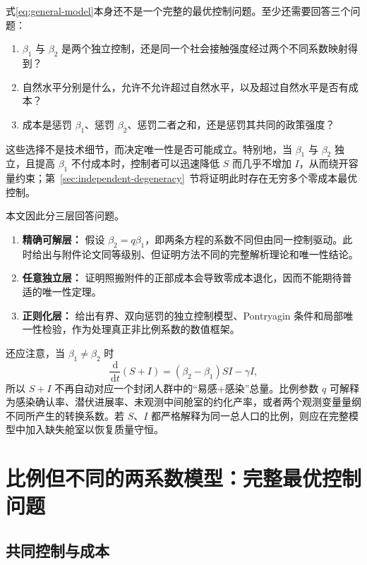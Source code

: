 \documentclass[11pt,a4paper,UTF8]{ctexart}
\theoremstyle{definition}
\newcommand{\dd}{\,\mathrm{d}}
\begin{document}
式\eqref{eq:general-model}本身还不是一个完整的最优控制问题。至少还需要回答三个问题：
\begin{enumerate}[label=(\roman*),leftmargin=3em]
\item $\beta_1$ 与 $\beta_2$ 是两个独立控制，还是同一个社会接触强度经过两个不同系数映射得到？
\item 自然水平分别是什么，允许不允许超过自然水平，以及超过自然水平是否有成本？
\item 成本是惩罚 $\beta_1$、惩罚 $\beta_2$、惩罚二者之和，还是惩罚其共同的政策强度？
\end{enumerate}
这些选择不是技术细节，而决定唯一性是否可能成立。特别地，当 $\beta_1$ 与 $\beta_2$ 独立，且提高 $\beta_1$ 不付成本时，控制者可以迅速降低 $S$ 而几乎不增加 $I$，从而绕开容量约束；第~\ref{sec:independent-degeneracy}~节将证明此时存在无穷多个零成本最优控制。

本文因此分三层回答问题。
\begin{enumerate}[label=\arabic*.,leftmargin=2.6em]
\item \textbf{精确可解层：} 假设 $\beta_2=q\beta_1$，即两条方程的系数不同但由同一控制驱动。此时给出与附件论文同等级别、但证明方法不同的完整解析理论和唯一性结论。
\item \textbf{任意独立层：} 证明照搬附件的正部成本会导致零成本退化，因而不能期待普适的唯一性定理。
\item \textbf{正则化层：} 给出有界、双向惩罚的独立控制模型、Pontryagin 条件和局部唯一性检验，作为处理真正非比例系数的数值框架。
\end{enumerate}

还应注意，当 $\beta_1\ne\beta_2$ 时
\[
\frac{\dd}{\dd t}(S+I)=(\beta_2-\beta_1)SI-\gamma I,
\]
所以 $S+I$ 不再自动对应一个封闭人群中的“易感+感染”总量。比例参数 $q$ 可解释为感染确认率、潜伏进展率、未观测中间舱室的约化产率，或者两个观测变量量纲不同所产生的转换系数。若 $S$、$I$ 都严格解释为同一总人口的比例，则应在完整模型中加入缺失舱室以恢复质量守恒。

\section{比例但不同的两系数模型：完整最优控制问题}

\subsection{共同控制与成本}
\end{document}

